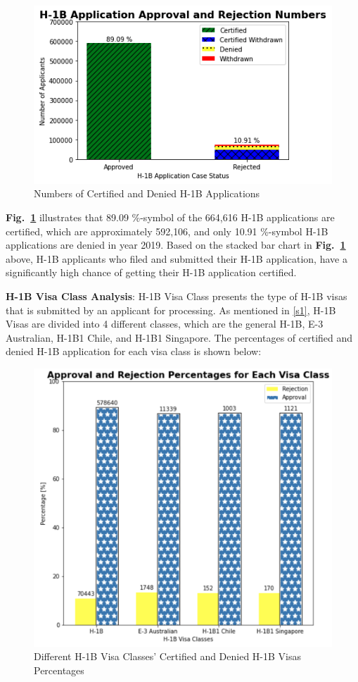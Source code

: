 \documentclass[conference]{IEEEtran}
\begin{document}
\begin{figure}[htbp]
\centerline{\includegraphics[scale = 0.5]{Case_Status.png}}
\caption{Numbers of Certified and Denied H-1B Applications}
\label{fig_cs_1}
\end{figure}

\textbf{Fig.~\ref{fig_cs_1}} illustrates that 89.09 \%-symbol of the 664,616 H-1B applications are certified, which are approximately 592,106, and only 10.91 \%-symbol H-1B applications are denied in year 2019. Based on the stacked bar chart in \textbf{Fig.~\ref{fig_cs_1}} above, H-1B applicants who filed and submitted their H-1B application, have a significantly high chance of getting their H-1B application certified.

\textbf{H-1B Visa Class Analysis}: H-1B Visa Class presents the type of H-1B visas that is submitted by an applicant for processing. As mentioned in \ref{s1}, H-1B Visas are divided into 4 different classes, which are the general H-1B, E-3 Australian, H-1B1 Chile, and H-1B1 Singapore. The percentages of certified and denied H-1B application for each visa class is shown below:

\begin{figure}[htbp]
\centerline{\includegraphics[scale = 0.30]{Visa_Class.png}}
\caption{Different H-1B Visa Classes' Certified and Denied H-1B Visas Percentages}
\label{fig_vc_1}
\end{figure}
\end{document}
